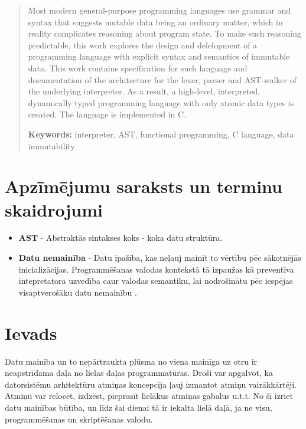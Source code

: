 \documentclass[12pt,a4paper]{report}
\begin{document}
\begin{abstract}
    Most modern general-purpose programming languages use grammar and syntax that suggests mutable data being an ordinary matter, which in reality complicates reasoning about program state.
    To make such reasoning predictable, this work explores the design and delelopment of a programming language with explicit syntax and semantics of immutable data. 
    This work contains specification for such language and documentation of the architecture for the lexer, parser and AST-walker of the underlying interpreter.
    As a result, a high-level, interpreted, dynamically typed programming language with only atomic data types is created. The language is implemented in C.

    \begin{flushleft}
    \textbf{Keywords:} interpreter, AST, functional programming, C language, data immutability
    \end{flushleft}
\end{abstract} 

\tableofcontents

\newpage
\chapter*{Apzīmējumu saraksts un terminu skaidrojumi}

\begin{itemize}
  \item \textbf{AST} - Abstraktās sintakses koks - koka datu struktūra.
  \item \textbf{Datu nemainība} - Datu īpašība, kas neļauj mainīt to vērtību pēc sākotnējās inicializācijas. Programmēšanas valodas kontekstā tā izpaužas kā preventīva intepretatora uzvedība caur valodas semantiku, lai nodrošinātu pēc iespējas visaptverošāku datu nemainību \cite{immutability}.
\end{itemize}

\newpage
\chapter*{Ievads}

Datu mainība un to nepārtraukta plūsma no viena mainīga uz otru ir neapstrīdama daļa no lielas daļas programmatūras. Droši var apgalvot, ka datorsistēmu arhitektūru atmiņas koncepcija ļauj izmantot atmiņu vairākkārtēji. Atmiņu var relocēt, izdzēst, pieprasīt lielākus atmiņas gabalus u.t.t. No šī izriet datu mainības būtība, un līdz šai dienai tā ir iekalta lielā daļā, ja ne visu, programmēšanas un skriptēšanas valodu.   
\end{document}
